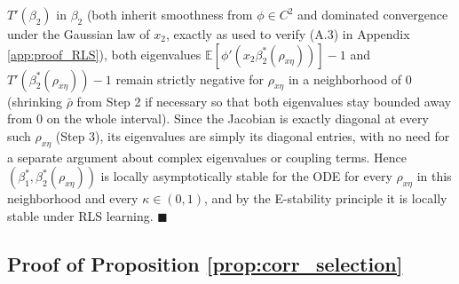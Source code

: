 $T'(\beta_2)$ in $\beta_2$ (both inherit smoothness from $\phi\in C^2$ and dominated convergence under
the Gaussian law of $x_2$, exactly as used to verify (A.3) in Appendix \ref{app:proof_RLS}), both
eigenvalues $\mathbb E[\phi'(x_2\beta_2^*(\rho_{x\eta}))]-1$ and $T'(\beta_2^*(\rho_{x\eta}))-1$ remain
strictly negative for $\rho_{x\eta}$ in a neighborhood of $0$ (shrinking $\bar\rho$ from Step 2 if
necessary so that both eigenvalues stay bounded away from $0$ on the whole interval). Since the Jacobian
is exactly diagonal at every such $\rho_{x\eta}$ (Step 3), its eigenvalues are simply its diagonal
entries, with no need for a separate argument about complex eigenvalues or coupling terms. Hence
$(\beta_1^*,\beta_2^*(\rho_{x\eta}))$ is locally asymptotically stable for the ODE for every
$\rho_{x\eta}$ in this neighborhood and every $\kappa\in(0,1)$, and by the E-stability principle it is
locally stable under RLS learning. $\blacksquare$

\subsection{Proof of Proposition \ref{prop:corr_selection}}\label{app:proof_LASSO_corr}

